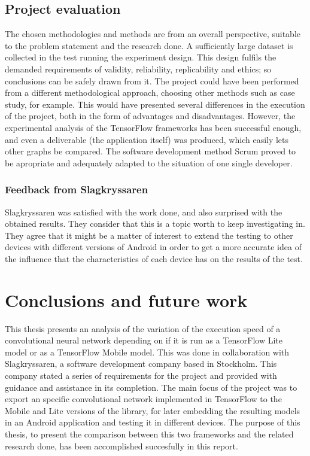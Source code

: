 \subsection{Project evaluation}
The chosen methodologies and methods are from an overall perspective, suitable to the problem statement and the research done. A sufficiently large dataset is collected in the test running the experiment design. This design fulfils the demanded requirements of validity, reliability, replicability and ethics; so conclusions can be safely drawn from it. The project could have been performed from a different methodological approach, choosing other methods such as case study, for example. This would have presented several differences in the execution of the project, both in the form of advantages and disadvantages. However, the experimental analysis of the TensorFlow frameworks has been successful enough, and even a deliverable (the application itself) was produced, which easily lets other graphs be compared. The software development method Scrum proved to be apropriate and adequately adapted to the situation of one single developer. 
\subsubsection{Feedback from Slagkryssaren}
Slagkryssaren was satisfied with the work done, and also surprised with the obtained results. They consider that this is a topic worth to keep investigating in. They agree that it might be a matter of interest to extend the testing to other devices with different versions of Android in order to get a more accurate idea of the influence that the characteristics of each device has on the results of the test. \\

\newpage
\section{Conclusions and future work}

This thesis presents an analysis of the variation of the execution speed of a convolutional neural network depending on if it is run as a TensorFlow Lite model or as a TensorFlow Mobile model. This was done in collaboration with Slagkryssaren, a software development company based in Stockholm. This company stated a series of requirements for the project and provided with guidance and assistance in its completion. The main focus of the project was to export an specific convolutional network implemented in TensorFlow to the Mobile and Lite versions of the library, for later embedding the resulting models in an Android application and testing it in different devices. The purpose of this thesis, to present the comparison between this two frameworks and the related research done, has been accomplished succesfully in this report. \\

